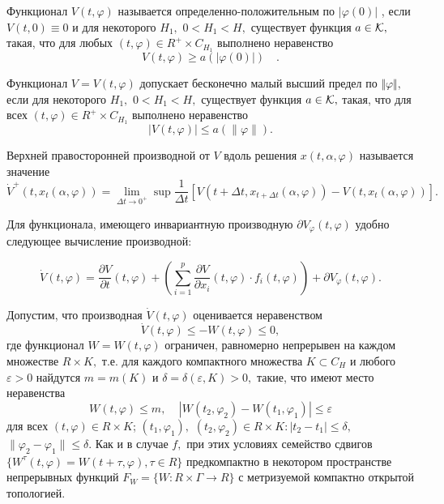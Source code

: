 	Функционал $V(t,\varphi )$ называется
		оп\-ре\-де\-лен\-но-по\-ло\-жи\-тель\-ным по $|\varphi(0)|$ , если $V(t,0)\equiv 0$ и для некоторого $H_1,$
		$0<H_1<H,$ существует функция $a\in {\cal K},$ такая, что для
		любых $(t,\varphi) \in R^+\times C_{H_1}$ выполнено неравенство $$
		V(t,\varphi )\ge a(|\varphi (0)|)\quad. $$
	
	Функционал $V=V(t,\varphi )$ допускает бесконечно
		малый высший предел по $\Vert \varphi \Vert,$ если для некоторого
		$H_1,$ $0<H_1<H,$ существует функция $a\in {\cal K},$ такая, что
		для всех  $(t,\varphi) \in R^+\times C_{H_1}$ выполнено
		неравенство $$ |V(t,\varphi )|\le a(\|\varphi\| ). $$
	
	Верхней правосторонней производной от $V$ вдоль решения $x(t,\alpha,\varphi )$
	называется значение \cite{kra591, heil84} 
	\begin{equation}\label{der42}
	\dot V^+(t,x_t(\alpha,\varphi ))=\lim\limits_{\Delta t\to
		0^+}\sup\frac1{\Delta t}\left[ V(t+\Delta t,x_{t+\Delta t}(\alpha
	,\varphi ))-V(t,x_t(\alpha,\varphi ))\right].
	\end{equation}
	
	Для функционала, имеющего инвариантную производную $\partial V_{\varphi} (t, \varphi)$ удобно следующее вычисление производной: \cite{andr10}
	
	\begin{equation}\label{1.3}
	\dot V(t,\varphi)=\frac{\partial V}{\partial t}(t,\varphi)+
	\left( \sum\limits_{i=1}^p\frac{\partial V}{\partial
		x_i}(t,\varphi )\cdot f_i(t,\varphi )\right) +\partial
	V_{\varphi}(t,\varphi ).
	\end{equation}

Допустим, что производная $\dot V(t,\varphi )$ оценивается неравенством
\begin{equation}
\dot V(t,\varphi )\le -W(t,\varphi )\le 0, \label{3.3'}
\end{equation}
где функционал $W=W(t,\varphi )$ ограничен, равномерно непрерывен
на каждом множестве $R \times K,$ т.е. для каждого компактного
множества $K\subset C_H$ и любого $\varepsilon >0$ найдутся
$m=m(K)$ и $\delta =\delta (\varepsilon ,K)>0,$ такие, что имеют
место неравенства
\begin{equation}
W(t,\varphi )\le m,\ \ \ \ \ |W(t_2,\varphi _2)-W(t_1,\varphi
_1)|\le\varepsilon \label{3.4'}
\end{equation}
для всех $(t,\varphi )\in R \times K$; $(t_1,\varphi _1),$
$(t_2,\varphi _2)\in R \times K : |t_2-t_1|\le \delta,$
$\|\varphi _2-\varphi _1\|\le\delta.$
Как и в случае $f,$ при этих  условиях семейство сдвигов $\{
W^{\tau }(t,\varphi )=W(t+\tau ,\varphi ), \tau\in R\}$
предкомпактно в некотором пространстве непрерывных функций
$F_{W}=\{ W : R\times\Gamma\to R\}$  с метризуемой компактно
открытой топологией.

